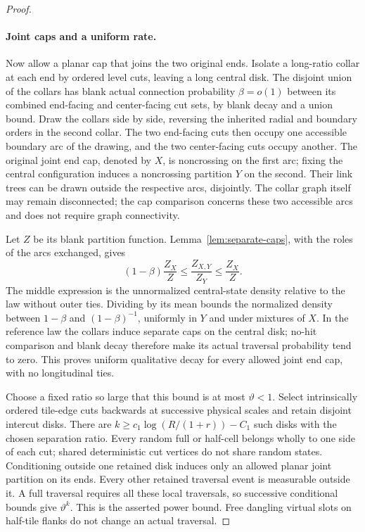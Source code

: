 \begin{proof}
\paragraph{Joint caps and a uniform rate.}
Now allow a planar cap that joins the two original ends.  Isolate a
long-ratio collar at each end by ordered level cuts, leaving a long
central disk.  The disjoint union of the collars has blank actual
connection probability $\beta=o(1)$ between its combined end-facing
and center-facing cut sets, by blank decay and a union bound.
Draw the collars side by side, reversing the inherited radial and
boundary orders in the second collar.  The two end-facing cuts then
occupy one accessible boundary arc of the drawing, and the two
center-facing cuts occupy another.  The original joint end cap, denoted
by $X$, is noncrossing on the first arc; fixing the central configuration
induces a noncrossing partition $Y$ on the second.  Their link trees
can be drawn outside the respective arcs, disjointly.  The collar
graph itself may remain disconnected; the cap comparison concerns
these two accessible arcs and does not require graph connectivity.

Let $Z$ be its blank partition function.  Lemma~\ref{lem:separate-caps},
with the roles of the arcs exchanged, gives
\begin{equation}\label{disk:joint-cap-density}
 (1-\beta)\frac{Z_X}{Z}
 \le\frac{Z_{X,Y}}{Z_Y}\le\frac{Z_X}{Z}.
\end{equation}
The middle expression is the unnormalized central-state density
relative to the law without outer ties.  Dividing by its mean bounds
the normalized density between $1-\beta$ and $(1-\beta)^{-1}$,
uniformly in $Y$ and under mixtures of $X$.  In the reference law the
collars induce separate caps on the central disk; no-hit comparison
and blank decay therefore make its actual traversal probability tend
to zero.  This proves uniform qualitative decay for every allowed
joint end cap, with no longitudinal ties.

Choose a fixed ratio so large that this bound is at most
$\vartheta<1$.  Select intrinsically ordered tile-edge cuts backwards
at successive physical scales and retain disjoint intercut disks.
There are
$k\ge c_1\log(R/(1+r))-C_1$ such disks with the chosen separation
ratio.  Every random full or half-cell belongs wholly to one side of
each cut; shared deterministic cut vertices do not share random states.
Conditioning outside one retained disk induces only an allowed planar
joint partition on its ends.  Every other retained traversal event
is measurable outside it.  A full traversal requires all these local
traversals, so successive conditional bounds give $\vartheta^k$.
This is the asserted power bound.  Free dangling virtual slots on
half-tile flanks do not change an actual traversal.
\end{proof}

